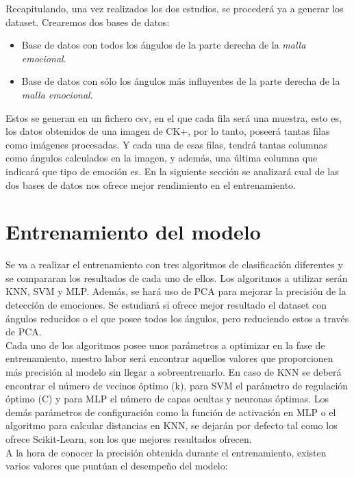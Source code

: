 Recapitulando, una vez realizados los dos estudios, se procederá ya a generar los dataset. Crearemos dos bases de datos:

\begin{itemize}
    \item Base de datos con todos los ángulos de la parte derecha de la \textit{malla emocional}.
    \item Base de datos con sólo los ángulos más influyentes de la parte derecha de la \textit{malla emocional}.
\end{itemize}

Estos se generan en un fichero csv, en el que cada fila será una muestra, esto es, los datos obtenidos de una imagen de CK+, por lo tanto, poseerá tantas filas como imágenes procesadas. Y cada una de esas filas, tendrá tantas columnas como ángulos calculados en la imagen, y además, una última columna que indicará que tipo de emoción es.
En la siguiente sección se analizará cual de las dos bases de datos nos ofrece mejor rendimiento en el entrenamiento.

\section{Entrenamiento del modelo}
\label{sec:entrenamiento}

Se va a realizar el entrenamiento con tres algoritmos de clasificación diferentes y se compararan los resultados de cada uno de ellos. Los algoritmos a utilizar serán KNN, SVM y MLP. Además, se hará uso de PCA para mejorar la precisión de la detección de emociones. Se estudiará si ofrece mejor resultado el dataset con ángulos reducidos o el que posee todos los ángulos, pero reduciendo estos a través de PCA.\\

Cada uno de los algoritmos posee unos parámetros a optimizar en la fase de entrenamiento, nuestro labor será encontrar aquellos valores que proporcionen más precisión al modelo sin llegar a sobreentrenarlo. En caso de KNN se deberá encontrar el número de vecinos óptimo (k), para SVM el parámetro de regulación óptimo (C) y para MLP el número de capas ocultas y neuronas óptimas. Los demás parámetros de configuración como la función de activación en MLP o el algoritmo para calcular distancias en KNN, se dejarán por defecto tal como los ofrece Scikit-Learn, son los que mejores resultados ofrecen.\\

A la hora de conocer la precisión obtenida durante el entrenamiento, existen varios valores que puntúan el desempeño del modelo:

